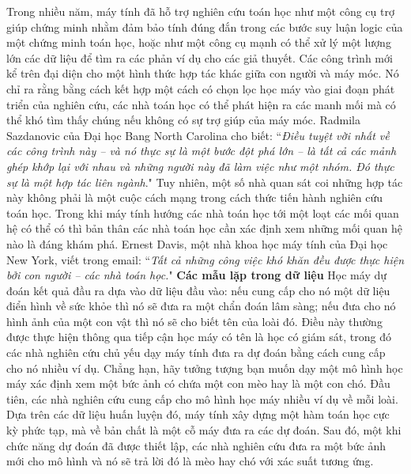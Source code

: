 \begin{multicols}{2}
	\vskip 0.05cm
	Trong nhiều năm, máy tính đã hỗ trợ nghiên cứu toán học như một công cụ trợ giúp chứng minh nhằm đảm bảo tính đúng đắn trong các bước suy luận logic của một chứng minh toán học, hoặc như một công cụ mạnh có thể xử lý một lượng lớn các dữ liệu để tìm ra các phản ví dụ cho các giả thuyết.
	\vskip 0.05cm
	Các công trình mới kể trên đại diện cho một hình thức hợp tác khác giữa con người và máy móc. Nó chỉ ra rằng bằng cách kết hợp một cách có chọn lọc học máy vào giai đoạn phát triển của nghiên cứu, các nhà toán học có thể phát hiện ra các manh mối mà có thể khó tìm thấy chúng nếu không có sự trợ giúp của máy móc.
	\vskip 0.05cm
	Radmila Sazdanovic của Đại học Bang North Carolina cho biết: ``\textit{Điều tuyệt vời nhất về các công trình này -- và nó thực sự là một bước đột phá lớn -- là tất cả các mảnh ghép khớp lại với nhau và những người này đã làm việc như một nhóm. Đó thực sự là một hợp tác liên ngành}."
	\vskip 0.05cm
	Tuy nhiên, một số nhà quan sát coi những hợp tác này không phải là một cuộc cách mạng trong cách thức tiến hành nghiên cứu toán học. Trong khi máy tính hướng các nhà toán học tới một loạt các mối quan hệ có thể có thì bản thân các nhà toán học cần xác định xem những mối quan hệ nào là đáng khám phá.
	\vskip 0.05cm
	Ernest Davis, một nhà khoa học máy tính của Đại học New York, viết trong email: ``\textit{Tất cả những công việc khó khăn đều được thực hiện bởi con người -- các nhà toán học.}"
	\vskip 0.05cm
	\textbf{\color{duongvaotoanhoc}Các mẫu lặp trong dữ liệu}
	\vskip 0.05cm
	Học máy dự đoán kết quả đầu ra dựa vào dữ liệu đầu vào: nếu cung cấp cho nó một dữ liệu điển hình về sức khỏe thì nó sẽ đưa ra một chẩn đoán lâm sàng; nếu đưa cho nó hình ảnh của một con vật thì nó sẽ cho biết tên của loài đó.
	\vskip 0.05cm
	Điều này thường được thực hiện thông qua tiếp cận học máy có tên là học có giám sát, trong đó các nhà nghiên cứu chủ yếu dạy máy tính đưa ra dự đoán bằng cách cung cấp cho nó nhiều ví dụ.
	\vskip 0.05cm
	Chẳng hạn, hãy tưởng tượng bạn muốn dạy một mô hình học máy xác định xem một bức ảnh có chứa một con mèo hay là một con chó. Đầu tiên, các nhà nghiên cứu cung cấp cho mô hình học máy nhiều ví dụ về mỗi loài. Dựa trên các dữ liệu huấn luyện đó, máy tính xây dựng một hàm toán học cực kỳ phức tạp, mà về bản chất là một cỗ máy đưa ra các dự đoán. Sau đó, một khi chức năng dự đoán đã được thiết lập, các nhà nghiên cứu đưa ra một bức ảnh mới cho mô hình và nó sẽ trả lời đó là mèo hay chó với xác suất tương ứng.
	\begin{figure}[H]
		\centering
		\vspace*{-5pt}

\end{figure}
\end{multicols}
